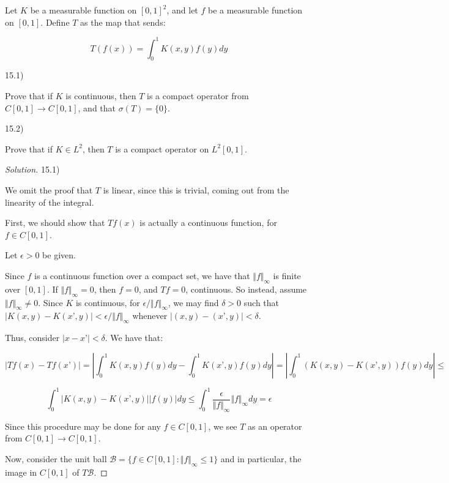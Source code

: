 \documentclass[10pt]{article}
\newenvironment{problem}[2][]{\begin{trivlist}
\item[\hskip \labelsep {\bfseries #1}\hskip \labelsep {\bfseries #2.}]}{\end{trivlist}}
\begin{document}
\begin{problem}{Question 15}

Let $K$ be a measurable function on $[0,1]^2$, and let $f$ be a measurable function on $[0,1]$. Define $T$ as the map that sends:

$$ T(f(x)) = \int_0^1 K(x,y)f(y) dy $$

15.1)

Prove that if $K$ is continuous, then $T$ is a compact operator from $C[0,1] \to C[0,1]$, and that $\sigma(T) = \{ 0 \}$.

15.2)

Prove that if $K \in L^2$, then $T$ is a compact operator on $L^2[0,1]$.

\end{problem}

\begin{proof}[Solution]

15.1)

We omit the proof that $T$ is linear, since this is trivial, coming out from the linearity of the integral.

First, we should show that $Tf(x)$ is actually a continuous function, for $f \in C[0,1]$.

Let $\epsilon > 0$ be given. 

Since $f$ is a continuous function over a compact set, we have that $\Vert f \Vert_\infty$ is finite over $[0,1]$. If $\Vert f \Vert_\infty = 0$, then $f = 0$, and $Tf = 0$, continuous. So instead, assume $\Vert f \Vert_\infty \not = 0$. Since $K$ is continuous, for $\epsilon/\Vert f \Vert_\infty$, we may find $\delta > 0$ such that $| K(x, y) - K(x’,y) | < \epsilon/\Vert f \Vert_\infty$ whenever $|(x, y) - (x’,y)| < \delta$.

Thus, consider $| x - x’| < \delta$. We have that:

$$ | Tf(x) - Tf(x’) | = \left| \int_0^1 K(x,y) f(y) dy - \int_0^1 K(x’,y) f(y) dy \right| = \left| \int_0^1 (K(x,y) - K(x’,y)) f(y) dy \right|  \leq $$

$$ \int_0^1 | K(x,y) - K(x’, y)| |f(y)| dy \leq \int_0^1 \frac{\epsilon}{\Vert f \Vert_\infty} \Vert f \Vert_\infty dy = \epsilon$$

Since this procedure may be done for any $f \in C[0,1]$, we see $T$ as an operator from $C[0,1] \to C[0,1]$.

Now, consider the unit ball $\mathcal{B} = \{ f \in C[0,1] : \Vert f \Vert_\infty \leq 1 \}$ and in particular, the image in $C[0,1]$ of $T\mathcal{B}$.


\end{proof}
\end{document}
